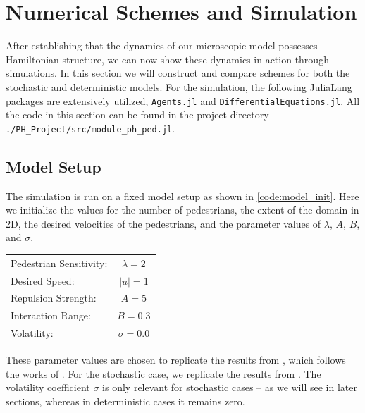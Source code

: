 \section{Numerical Schemes and Simulation}
After establishing that the dynamics of our microscopic model possesses Hamiltonian structure, we can now show these dynamics in action through simulations. In this section we will construct and compare schemes for both the stochastic and deterministic models. For the simulation, the following JuliaLang packages are extensively utilized, \texttt{Agents.jl} and \texttt{DifferentialEquations.jl}. All the code in this section can be found in the project directory \texttt{./PH\_Project/src/module\_ph\_ped.jl}.

\subsection{Model Setup}
The simulation is run on a fixed model setup as shown in \autoref{code:model_init}. Here we initialize the values for the number of pedestrians, the extent of the domain in 2D, the desired velocities of the pedestrians, and the parameter values of $\lambda$, $A$, $B$, and $\sigma$.
\begin{table}[H]
    \begin{tabular}{lc}
        Pedestrian Sensitivity: & $\lambda = 2$ \\
        Desired Speed: & $|u| = 1$ \\
        Repulsion Strength: & $A = 5$ \\
        Interaction Range: & $B = 0.3$ \\
        Volatility: & $\sigma = 0.0$
    \end{tabular}
\end{table}
These parameter values are chosen to replicate the results from \cite{tordeux2022multi}, which follows the works of \cite{helbing1995social,tordeux2016collision}. For the stochastic case, we replicate the results from \cite{khelfa2021initiating}. The volatility coefficient $\sigma$ is only relevant for stochastic cases -- as we will see in later sections, whereas in deterministic cases it remains zero.

